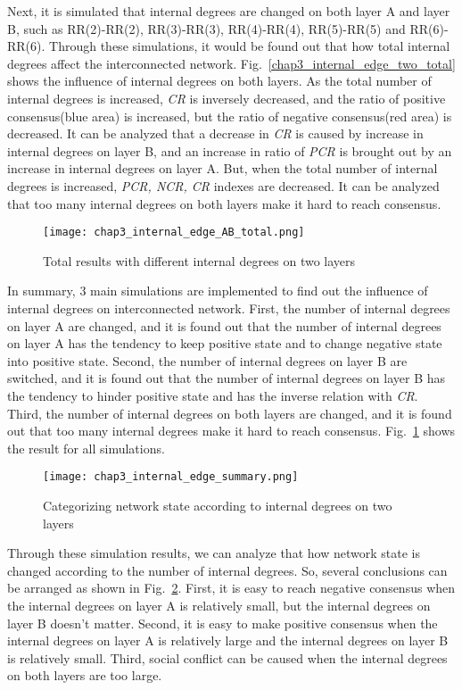Next, it is simulated that internal degrees are changed on both layer A and layer B, such as RR(2)-RR(2), RR(3)-RR(3), RR(4)-RR(4), RR(5)-RR(5) and RR(6)-RR(6). Through these simulations, it would be found out that how total internal degrees affect the interconnected network.
Fig.~\ref{chap3_internal_edge_two_total} shows the influence of internal degrees on both layers. As the total number of internal degrees is increased, \textit{CR} is inversely decreased, and the ratio of positive consensus(blue area) is increased, but the ratio of negative consensus(red area) is decreased. It can be analyzed that a decrease in \textit{CR} is caused by increase in internal degrees on layer B, and an increase in ratio of \textit{PCR} is brought out by an increase in internal degrees on layer A. But, when the total number of internal degrees is increased, \textit{PCR, NCR, CR} indexes are decreased. It can be analyzed that too many internal degrees on both layers make it hard to reach consensus. 
\begin{figure}[!htb]
	\centering
	\texttt{[image: chap3\_internal\_edge\_AB\_total.png]}
	\caption{Total results with different internal degrees on two layers}
	\label{chap3_internal_edge_AB_total}
\end{figure}
In summary, 3 main simulations are implemented to find out the influence of internal degrees on interconnected network. First, the number of internal degrees on layer A are changed, and it is found out that the number of internal degrees on layer A has the tendency to keep positive state and to change negative state into positive state. Second, the number of internal degrees on layer B are switched, and it is found out that the number of internal degrees on layer B has the tendency to hinder positive state and has the inverse relation with \textit{CR}. Third, the number of internal degrees on both layers are changed, and it is found out that too many internal degrees make it hard to reach consensus. Fig.~\ref{chap3_internal_edge_AB_total} shows the result for all simulations. 
\begin{figure}[!htb]
	\centering
	\texttt{[image: chap3\_internal\_edge\_summary.png]}
	\caption{Categorizing network state according to internal degrees on two layers}
	\label{chap3_internal_edge_summary}
\end{figure}
Through these simulation results, we can analyze that how network state is changed according to the number of internal degrees. So, several conclusions can be arranged as shown in Fig.~\ref{chap3_internal_edge_summary}.  First, it is easy to reach negative consensus when the internal degrees on layer A is relatively small, but the internal degrees on layer B doesn't matter. Second, it is easy to make positive consensus when the internal degrees on layer A is relatively large and the internal degrees on layer B is relatively small. Third, social conflict can be caused when the internal degrees on both layers are too large.  

